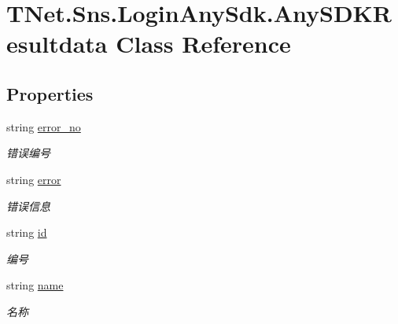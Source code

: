 \hypertarget{class_t_net_1_1_sns_1_1_login_any_sdk_1_1_any_s_d_k_resultdata}{}\section{T\+Net.\+Sns.\+Login\+Any\+Sdk.\+Any\+S\+D\+K\+Resultdata Class Reference}
\label{class_t_net_1_1_sns_1_1_login_any_sdk_1_1_any_s_d_k_resultdata}


 


\subsection*{Properties}
\begin{DoxyCompactItemize}
\item 
string \mbox{\hyperlink{class_t_net_1_1_sns_1_1_login_any_sdk_1_1_any_s_d_k_resultdata_af585e2da3e8e225658a997dcc1e76ec7}{error\+\_\+no}}
\begin{DoxyCompactList}\small\item\em 错误编号 \end{DoxyCompactList}\item 
string \mbox{\hyperlink{class_t_net_1_1_sns_1_1_login_any_sdk_1_1_any_s_d_k_resultdata_aa0a2eba1a164175c9275afc9f7682350}{error}}
\begin{DoxyCompactList}\small\item\em 错误信息 \end{DoxyCompactList}\item 
string \mbox{\hyperlink{class_t_net_1_1_sns_1_1_login_any_sdk_1_1_any_s_d_k_resultdata_ac542672eb2f2387a0a7edde091a4efe0}{id}}
\begin{DoxyCompactList}\small\item\em 编号 \end{DoxyCompactList}\item 
string \mbox{\hyperlink{class_t_net_1_1_sns_1_1_login_any_sdk_1_1_any_s_d_k_resultdata_acab9cf571de58c3bf704752e0404f9fd}{name}}
\begin{DoxyCompactList}\small\item\em 名称 \end{DoxyCompactList}\item 

\end{DoxyCompactItemize}
